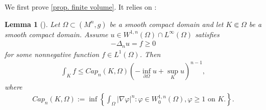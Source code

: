 \documentclass[12pt]{amsart}
\theoremstyle{plain}
\newtheorem{lemma}[theorem]{Lemma}
\theoremstyle{definition}
\theoremstyle{remark}     %
\begin{document}
We  first prove \cref{prop. finite volume}. 
It relies on \cite[Lemma 4.2]{CMR26}:
\begin{lemma}[\cite{CMR26}]\label{lem. upper bound of total curvature}
     Let $\Omega\subset (M^n,g)$ be a smooth compact domain and let $K\Subset \Omega$ be a smooth compact domain. Assume $u\in W^{1,n}(\Omega)\cap L^{\infty}(\Omega)$ satisfies
    \begin{align*}
        -\Delta_nu=f\geq 0
    \end{align*}
    for some nonnegative function $f\in L^1(\Omega)$. Then
    \begin{align}\label{ineq. lower bound of n-subharmonic function}
        \int_K f
        \leq Cap_n(K,\Omega)
        \left(-\inf_{\partial\Omega} u
        +\sup_{ K}u\right)^{n-1},
    \end{align}
    where
    \begin{align*}
        Cap_n(K,\Omega)
        :=\inf\left\{
        \int_{\Omega}|\nabla \varphi|^n:\varphi\in W_0^{1,n}(\Omega), \varphi\geq 1 \text{ on } K.
        \right\}.
    \end{align*}
\end{lemma}
\end{document}
